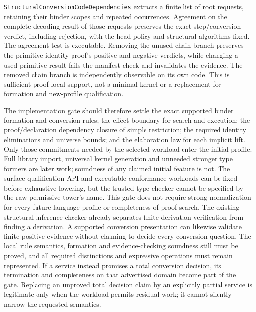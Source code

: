 \documentclass[11pt]{article}
\theoremstyle{definition}
\theoremstyle{remark}
\begin{document}
\nolinkurl{StructuralConversionCodeDependencies} extracts a finite list of
root requests, retaining their binder scopes and repeated occurrences.
Agreement on the complete decoding result of those requests preserves the
exact step/conversion verdict, including rejection, with the head policy and
structural algorithms fixed. The agreement test is executable. Removing the
unused chain branch preserves the primitive identity proof's positive and
negative verdicts, while changing a used primitive result fails the manifest
check and invalidates the evidence. The removed chain branch is independently
observable on its own code. This is sufficient proof-local support, not a
minimal kernel or a replacement for formation and new-profile qualification.

The implementation gate should therefore settle the exact supported binder
formation and conversion rules; the effect boundary for search and execution;
the proof/declaration dependency closure of simple restriction; the required
identity eliminations and universe bounds; and the elaboration law for each
implicit lift. Only those commitments needed by the selected workload enter
the initial profile. Full library import, universal kernel generation and
unneeded stronger type formers are later work; soundness of any claimed
initial feature is not. The surface qualification API and executable
conformance workloads can be fixed before exhaustive lowering, but the
trusted type checker cannot be specified by the raw permissive tower's name.
This gate does not require strong normalization for every future language
profile or completeness of proof search. The existing structural inference
checker already separates finite derivation verification from finding a
derivation. A supported conversion presentation can likewise validate finite
positive evidence without claiming to decide every conversion question.
The local rule semantics, formation and evidence-checking soundness still
must be proved, and all required distinctions and expressive operations must
remain represented. If a service instead promises a total conversion
decision, its termination and completeness on that advertised domain become
part of the gate. Replacing an unproved total decision claim by an explicitly
partial service is legitimate only when the workload permits residual work;
it cannot silently narrow the requested semantics.
\end{document}
